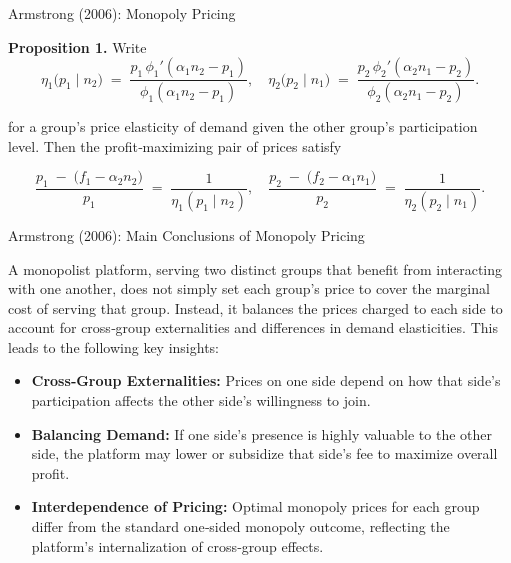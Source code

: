 \documentclass[aspectratio=169]{beamer}  %
\begin{document}
\begin{frame}{Armstrong (2006): Monopoly Pricing}
    \justifying  %
    
    \textbf{Proposition 1.} Write
    \[
      \eta_{1}\bigl(p_{1} \mid n_{2}\bigr) 
      \;=\; 
      \frac{p_{1}\,\phi_{1}'(\alpha_{1}n_{2} - p_{1})}{\phi_{1}(\alpha_{1}n_{2} - p_{1})},
      \quad
      \eta_{2}\bigl(p_{2} \mid n_{1}\bigr) 
      \;=\;
      \frac{p_{2}\,\phi_{2}'(\alpha_{2}n_{1} - p_{2})}{\phi_{2}(\alpha_{2}n_{1} - p_{2})}.
    \]
    
    for a group’s price elasticity of demand given the other group’s participation level.  
    Then the profit‐maximizing pair of prices satisfy
    
    \[
      \frac{p_{1} \;-\; \bigl(f_{1} - \alpha_{2}n_{2}\bigr)}{p_{1}}
      \;=\;
      \frac{1}{\eta_{1}(p_{1} \mid n_{2})},
      \quad
      \frac{p_{2} \;-\; \bigl(f_{2} - \alpha_{1}n_{1}\bigr)}{p_{2}}
      \;=\;
      \frac{1}{\eta_{2}(p_{2} \mid n_{1})}.
    \]
    
    \end{frame}

\begin{frame}{Armstrong (2006): Main Conclusions of Monopoly Pricing}
    \justifying  %
    
    A monopolist platform, serving two distinct groups that benefit from interacting 
    with one another, does not simply set each group’s price to cover the marginal 
    cost of serving that group. Instead, it balances the prices charged to each side 
    to account for cross‐group externalities and differences in demand elasticities.
    This leads to the following key insights:
    
    \begin{itemize}
        \item \textbf{Cross‐Group Externalities:} Prices on one side depend on how 
        that side’s participation affects the other side’s willingness to join.
    
        \item \textbf{Balancing Demand:} If one side’s presence is highly valuable 
        to the other side, the platform may lower or subsidize that side’s fee 
        to maximize overall profit.
    
        \item \textbf{Interdependence of Pricing:} Optimal monopoly prices for each 
        group differ from the standard one‐sided monopoly outcome, reflecting 
        the platform’s internalization of cross‐group effects.
    \end{itemize}
    
\end{frame}
\end{document}
